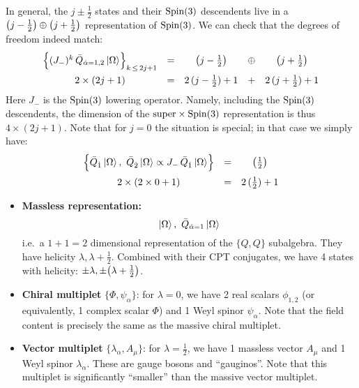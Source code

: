 \documentclass[a4paper
	,10pt
]{article}
\begin{document}
	In general, the $j \pm \frac{1}{2}$ states and their $\mathrm{Spin}(3)$ descendents live in a $
		\pqty{j - \frac{1}{2}}
		\oplus
		\pqty{j + \frac{1}{2}}
	$ representation of $\mathrm{Spin}(3)$. We can check that the degrees of freedom indeed match:
	\begin{equation}
	\begin{array}{ccccc}
		\Bqty\Big{
			(J_-)^k\,
			\bar{Q}_{\dot{\alpha}=1,2}
			\ket{\Omega}
		}_{k\,\le\,2j+1}
		&=& \pqty{j - \tfrac{1}{2}}
			&\oplus&
			\pqty{j + \tfrac{1}{2}}
	\\[2ex]
		2\times (2j+1)
		&=& 2\,(j-\tfrac{1}{2}) + 1
			&+&
			2\,(j+\tfrac{1}{2}) + 1
	\end{array}
	\end{equation}
	Here $J_-$ is the $\mathrm{Spin}(3)$ lowering operator. 
	Namely, including the $\mathrm{Spin}(3)$ descendents, the dimension of the $\mathrm{super} \times \mathrm{Spin}(3)$ representation is thus $4\times (2j+1)$. 
	Note that for $j = 0$ the situation is special; in that case we simply have:
	\begin{equation}
	\begin{array}{ccccc}
		\Bqty\Big{
			\bar{Q}_{\dot{1}} \ket{\Omega},
			\ \bar{Q}_{\dot{2}} \ket{\Omega}
			\propto J_-\,
				\bar{Q}_{\dot{1}} \ket{\Omega}
		} 
		&=& \pqty{\tfrac{1}{2}}
	\\[2ex]
		2\times (2\times 0+1)
		&=& 2\,(\tfrac{1}{2}) + 1
	\end{array}
	\end{equation}
	
	\begin{itemize}[leftmargin=0pt,itemindent=*]
	\item \textbf{Massless representation:}
		\begin{equation}
			\ket{\Omega},
			\ \bar{Q}_{\dot{\alpha}=1} \ket{\Omega}
		\end{equation}
		i.e.~a $1+1 = 2$ dimensional representation of the $\{Q,Q\}$ subalgebra. They have helicity $\lambda,\lambda + \frac{1}{2}$. Combined with their CPT conjugates, we have 4 states with helicity: $\pm\lambda,\pm\pqty{\lambda + \frac{1}{2}}$. 
	\end{itemize}
	
	\begin{itemize}[label=--]
	\item \textbf{Chiral multiplet} $\{\Phi, \psi_\alpha\}$: for $\lambda = 0$, we have 2 real scalars $\phi_{1,2}$ (or equivalently, 1 complex scalar $\Phi$) and 1 Weyl spinor $\psi_\alpha$. Note that the field content is precisely the same as the massive chiral multiplet. 
	
	\item \textbf{Vector multiplet} $\{\lambda_\alpha, A_\mu\}$: for $\lambda = \frac{1}{2}$, we have 1 massless vector $A_\mu$ and 1 Weyl spinor $\lambda_\alpha$. These are gauge bosons and ``gauginos''. Note that this multiplet is significantly ``smaller'' than the massive vector multiplet. 
	\end{itemize}
	
\end{document}
